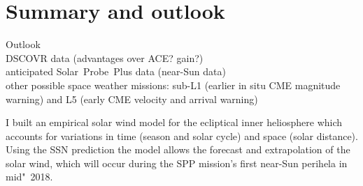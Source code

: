 \chapter{Summary and outlook}


Outlook\\
DSCOVR data (advantages over ACE? gain?)\\
anticipated Solar~Probe~Plus data (near-Sun data)\\

other possible space weather missions: sub-L1 (earlier in situ CME magnitude warning) and L5 (early CME velocity and arrival warning)


I built an empirical solar wind model for the ecliptical inner heliosphere which accounts for variations in time (season and solar cycle) and space (solar distance).\\

Using the SSN prediction the model allows the forecast and extrapolation of the solar wind, which will occur during the SPP mission's first near-Sun perihela in mid"~2018.\\



